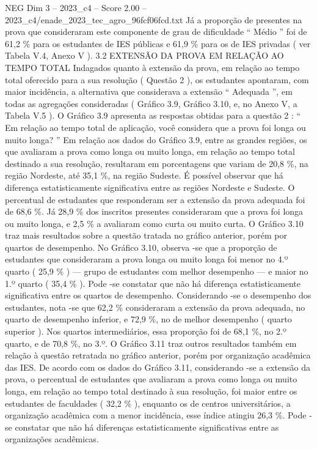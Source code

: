 \begin{textsample}{NEG Dim 3 – 2023\_c4 – Score 2.00 – 2023\_c4/enade\_2023\_tec\_agro\_96fcf06fcd.txt}
Já a proporção de presentes na prova que consideraram este componente de grau de dificuldade “ Médio ” foi de 61,2 \% para os estudantes de IES públicas e 61,9 \% para os de IES privadas ( ver Tabela V.4, Anexo V ). 3.2 EXTENSÃO DA PROVA EM RELAÇÃO AO TEMPO TOTAL Indagados quanto à extensão da prova, em relação ao tempo total oferecido para a sua resolução ( Questão 2 ), os estudantes apontaram, com maior incidência, a alternativa que considerava a extensão “ Adequada ”, em todas as agregações consideradas ( Gráfico 3.9, Gráfico 3.10, e, no Anexo V, a Tabela V.5 ).
O Gráfico 3.9 apresenta as respostas obtidas para a questão 2 : “ Em relação ao tempo total de aplicação, você considera que a prova foi longa ou muito longa? ” Em relação aos dados do Gráfico 3.9, entre as grandes regiões, os que avaliaram a prova como longa ou muito longa, em relação ao tempo total destinado a sua resolução, resultaram em porcentagens que variam de 20,8 \%, na região Nordeste, até 35,1 \%, na região Sudeste.
É possível observar que há diferença estatisticamente significativa entre as regiões Nordeste e Sudeste.
O percentual de estudantes que responderam ser a extensão da prova adequada foi de 68,6 \%.
Já 28,9 \% dos inscritos presentes consideraram que a prova foi longa ou muito longa, e 2,5 \% a avaliaram como curta ou muito curta.
O Gráfico 3.10 traz mais resultados sobre a questão tratada no gráfico anterior, porém por quartos de desempenho.
No Gráfico 3.10, observa -se que a proporção de estudantes que consideraram a prova longa ou muito longa foi menor no 4.º quarto ( 25,9 \% ) — grupo de estudantes com melhor desempenho — e maior no 1.º quarto ( 35,4 \% ).
Pode -se constatar que não há diferença estatisticamente significativa entre os quartos de desempenho.
Considerando -se o desempenho dos estudantes, nota -se que 62,2 \% consideraram a extensão da prova adequada, no quarto de desempenho inferior, e 72,9 \%, no de melhor desempenho ( quarto superior ).
Nos quartos intermediários, essa proporção foi de 68,1 \%, no 2.º quarto, e de 70,8 \%, no 3.º.
O Gráfico 3.11 traz outros resultados também em relação à questão retratada no gráfico anterior, porém por organização acadêmica das IES.
De acordo com os dados do Gráfico 3.11, considerando -se a extensão da prova, o percentual de estudantes que avaliaram a prova como longa ou muito longa, em relação ao tempo total destinado à sua resolução, foi maior entre os estudantes de faculdades ( 32,2 \% ), enquanto os de centros universitários, a organização acadêmica com a menor incidência, esse índice atingiu 26,3 \%.
Pode -se constatar que não há diferenças estatisticamente significativas entre as organizações acadêmicas.

\end{textsample}
